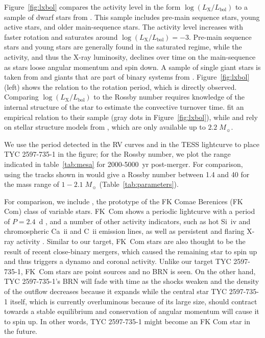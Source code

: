 \documentclass[linenumbers]{aastex631}
\begin{document}
Figure~\ref{fig:lxbol} compares the activity level in the form $\log(L_\mathrm{X}/L_\mathrm{bol})$ to a sample of dwarf stars from \citet{Wright+2011}. This sample includes pre-main sequence stars, young active stars, and older main-sequence stars. The activity level increases with faster rotation and saturates around $\log(L_\mathrm{X}/L_\mathrm{bol})=-3$. Pre-main sequence stars and young stars are generally found in the saturated regime, while the activity, and thus the X-ray luminosity, declines over time on the main-sequence as stars loose angular momentum and spin down.  A sample of single giant stars is taken from \citet{Gondoin+2005} and giants that are part of binary systems from \citet{Gondoin+2007}. Figure~\ref{fig:lxbol} (left) shows the relation to the rotation period, which is directly observed. Comparing $\log(L_\mathrm{X}/L_\mathrm{bol})$ to the Rossby number requires knowledge of the internal structure of the star to estimate the convective turnover time. \citet{Wright+2011} fit an empirical relation to their sample (gray dots in  Figure~\ref{fig:lxbol}), while \citet{Gondoin+2005} and \citet{Gondoin+2007} rely on stellar structure models from \citet{Gunn1998}, which are only available up to $2.2\;M_\sun$.

We use the period detected in the RV curves and in the TESS lightcurve to place TYC 2597-735-1 in the figure; for the Rossby number, we plot the range indicated in table~\ref{tab:mesa} for 2000-5000~yr post-merger. For comparison, using the tracks shown in \citet{Gunn1998} would give a Rossby number between 1.4 and 40 for the mass range of $1-2.1\;M_\sun{}$ (Table~\ref{tab:parameters}).

For comparison, we include , the prototype of the FK Comae Berenices (FK Com) class of variable stars. FK~Com shows a periodic lightcurve with a period of $P=2.4$~d \citep{1993A&A...278..449J}, and a number of other activity indicators, such as hot Si~{\sc iv} and chromospheric Ca~{\sc ii} and C~{\sc ii} emission lines, as well as persistent and flaring X-ray activity \citep{2016ApJS..223....5A}. Similar to our target, FK~Com stars are also thought to be the result of recent close-binary mergers, which caused the remaining star to spin up and thus triggers a dynamo and coronal activity. Unlike our target TYC 2597-735-1, FK~Com stars are point sources and no BRN is seen. On the other hand, TYC 2597-735-1's BRN will fade with time as the shocks weaken and the density of the outflow decreases because it expands while the central star TYC 2597-735-1 itself, which is currently overluminous because of its large size, should contract towards a stable equilibrium and conservation of angular momentum will cause it to spin up. In other words, TYC 2597-735-1 might become an FK Com star in the future.
\end{document}
